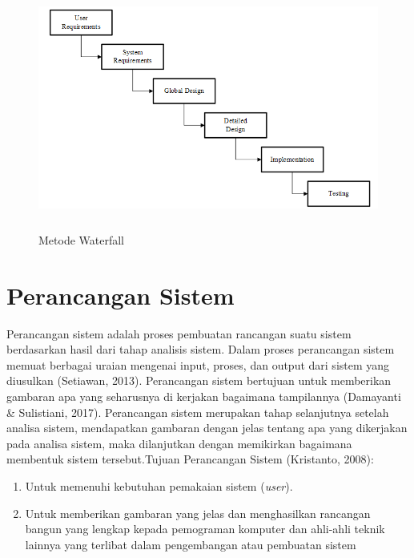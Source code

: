 \begin{figure}
	\centering
	\includegraphics [height=8cm, width=13cm]{konten/gambar/gbr201.png}
	\caption{Metode Waterfall}
	\label{gbr201}
\end{figure}
\section{Perancangan Sistem}
Perancangan sistem adalah proses pembuatan rancangan suatu sistem berdasarkan hasil dari tahap analisis sistem. Dalam proses perancangan sistem memuat berbagai uraian mengenai input, proses, dan output dari sistem yang diusulkan (Setiawan, 2013).
Perancangan sistem bertujuan untuk memberikan gambaran apa yang seharusnya di kerjakan bagaimana tampilannya (Damayanti \& Sulistiani, 2017).
Perancangan sistem merupakan tahap selanjutnya setelah analisa sistem, mendapatkan gambaran dengan jelas tentang apa yang dikerjakan pada analisa sistem, maka dilanjutkan dengan memikirkan bagaimana membentuk sistem tersebut.Tujuan Perancangan Sistem (Kristanto, 2008):

\begin{enumerate}
	
	\item Untuk memenuhi kebutuhan pemakaian sistem (\textit{user}).
	\item Untuk memberikan gambaran yang jelas dan menghasilkan rancangan bangun yang lengkap kepada pemograman komputer dan ahli-ahli teknik lainnya yang terlibat dalam pengembangan atau pembuatan sistem
	
\end{enumerate}

